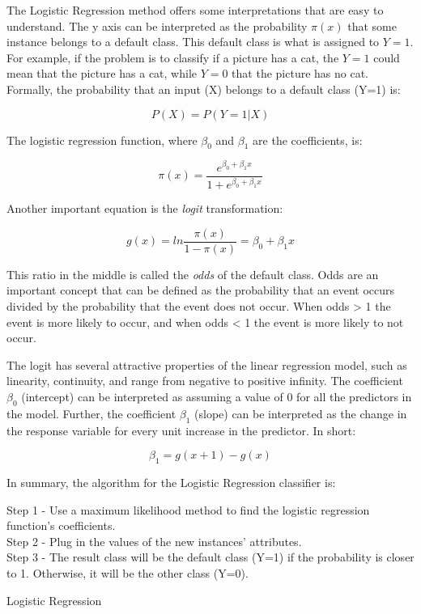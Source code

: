 The Logistic Regression method offers some interpretations that are easy to understand. The y axis can be interpreted as the probability $\pi(x)$ that some instance belongs to a default class. This default class is what is assigned to $Y=1$. For example, if the problem is to classify if a picture has a cat, the $Y=1$ could mean that the picture has a cat, while $Y=0$ that the picture has no cat. Formally, the probability that an input (X) belongs to a default class (Y=1) is:

\[ P(X) = P(Y=1|X) \]

The logistic regression function, where $\beta_0$ and $\beta_1$ are the coefficients, is:

\[ \pi(x) = \frac{e^{\beta_0+\beta_1x}}{1+e^{\beta_0+\beta_1x}} \]

Another important equation is the \emph{logit} transformation:

\[ g(x) = ln\frac{\pi(x)}{1-\pi(x)} = \beta_0+\beta_1x \]

This ratio in the middle is called the \emph{odds} of the default class. Odds are an important concept that can be defined as the probability that an event occurs divided by the probability that the event does not occur. When odds > 1 the event is more likely to occur, and when odds < 1 the event is more likely to not occur.

The logit has several attractive properties of the linear regression model, such as linearity, continuity, and range from negative to positive infinity. The coefficient $\beta_0$ (intercept) can be interpreted as assuming a value of 0 for all the predictors in the model. Further, the coefficient $\beta_1$ (slope) can be interpreted as the change in the response variable for every unit increase in the predictor. In short:

\[ \beta_1 = g(x+1) - g(x) \]

In summary, the algorithm for the Logistic Regression classifier is:

\begin{algorithm}[H]
Step 1 - Use a maximum likelihood method to find the logistic regression function's coefficients. \\
Step 2 - Plug in the values of the new instances' attributes. \\
Step 3 - The result class will be the default class (Y=1) if the probability is closer to 1. Otherwise, it will be the other class (Y=0). 
\caption{Logistic Regression}
\end{algorithm}

